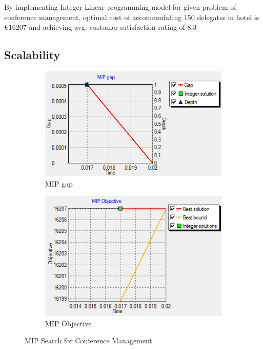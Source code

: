 \documentclass[paper=a4, fontsize=11pt]{scrartcl} %
\begin{document}
By implementing Integer Linear programming model for given problem of conference management, optimal cost of accommodating 150 delegates in hotel is \euro 16207 and achieving avg. customer satisfaction rating of 8.3\\

\subsection{Scalability}

\begin{figure}[!ht]
\centering
\begin{subfigure}{.5\textwidth}
  \centering
  \includegraphics[scale=.8]{g1.png}
  \caption{MIP gap}
  \label{fig:sub1}
\end{subfigure}%
\begin{subfigure}{.5\textwidth}
  \centering
  \includegraphics[scale=.7]{g2.png}
  \caption{MIP Objective}
  \label{fig:sub2}
\end{subfigure}
\caption{MIP Search for Conference Management} 
\label{fig:test}
\end{figure}
\end{document}
